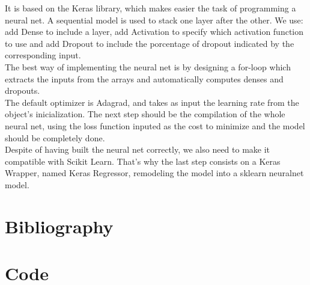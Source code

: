 \documentclass[a4paper,11pt,spanish]{report}
\begin{document}
It is based on the Keras library, which makes easier the task of programming a neural net. A sequential model is used to stack one layer after the other. We use: add Dense to include a layer, add Activation to specify which activation function to use and add Dropout to include the porcentage of dropout indicated by the corresponding input.\\
The best way of implementing the neural net is by designing a for-loop which extracts the inputs from the arrays and automatically computes denses and dropouts.\\
The default optimizer is Adagrad, and takes as input the learning rate from the object's inicialization. The next step should be the compilation of the whole neural net, using the loss function inputed as the cost to minimize and the model should be completely done.\\
Despite of having built the neural net correctly, we also need to make it compatible with Scikit Learn. That's why the last step consists on a Keras Wrapper, named Keras Regressor, remodeling the model into a sklearn neuralnet model.


\chapter*{Bibliography}
\label{chap:bib}

\nocite{*}

% 


\chapter*{Code}
\label{chap:code}


\end{document}
